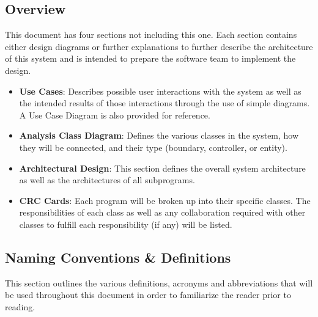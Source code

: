 \documentclass[titlepage]{article}
\begin{document}
\subsection{Overview}
This document has four sections not including this one. Each section contains either design diagrams or further explanations to further describe the architecture of this system and is intended to prepare the software team to implement the design.\\
\begin{itemize}
	\item \textbf{Use Cases}: Describes possible user interactions with the system as well as the intended results of those interactions through the use of simple diagrams. A Use Case Diagram is also provided for reference.\\
	\item \textbf{Analysis Class Diagram}: Defines the various classes in the system, how they will be connected, and their type (boundary, controller, or entity).\\
	\item \textbf{Architectural Design}: This section defines the overall system architecture as well as the architectures of all subprograms.\\
	\item \textbf{CRC Cards}: Each program will be broken up into their specific classes. The responsibilities of each class as well as any collaboration required with other classes to fulfill each responsibility (if any) will be listed.\\
\end{itemize}

\subsection{Naming Conventions \& Definitions}
This section outlines the various definitions, acronyms and abbreviations that will be used throughout this document in order to familiarize the reader prior to reading.
\newpage
\end{document}
